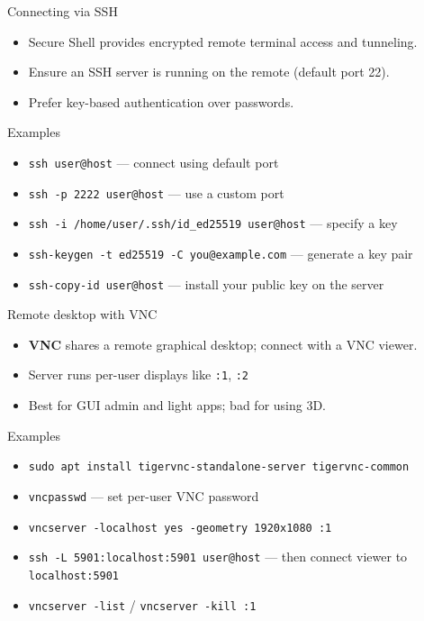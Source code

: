\documentclass{beamer}
\begin{document}
\begin{frame}{Connecting via SSH}
  \begin{itemize}
    \item Secure Shell provides encrypted remote terminal access and tunneling.
    \item Ensure an SSH server is running on the remote (default port 22).
    \item Prefer key-based authentication over passwords.
  \end{itemize}
  \begin{exampleblock}{Examples}
    \begin{itemize}
      \item \texttt{ssh user@host} — connect using default port
      \item \texttt{ssh -p 2222 user@host} — use a custom port
      \item \texttt{ssh -i /home/user/.ssh/id\_ed25519 user@host} — specify a key
      \item \texttt{ssh-keygen -t ed25519 -C you@example.com} — generate a key pair
      \item \texttt{ssh-copy-id user@host} — install your public key on the server
    \end{itemize}
  \end{exampleblock}
\end{frame}

\begin{frame}{Remote desktop with VNC}
  \begin{itemize}
    \item \textbf{VNC} shares a remote graphical desktop; connect with a VNC viewer.
    \item Server runs per-user displays like \texttt{:1}, \texttt{:2}
    \item Best for GUI admin and light apps; bad for using 3D.
  \end{itemize}
  \begin{exampleblock}{Examples}
    \begin{itemize}
      \item \texttt{sudo apt install tigervnc-standalone-server tigervnc-common}
      \item \texttt{vncpasswd} — set per-user VNC password
      \item \texttt{vncserver -localhost yes -geometry 1920x1080 :1} %
      \item \texttt{ssh -L 5901:localhost:5901 user@host} — then connect viewer to \texttt{localhost:5901}
      \item \texttt{vncserver -list} / \texttt{vncserver -kill :1} %
    \end{itemize}
  \end{exampleblock}
\end{frame}
\end{document}
